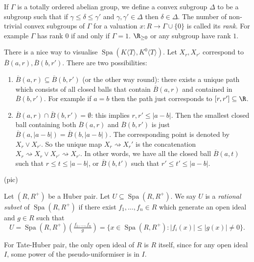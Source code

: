 \documentclass[a4paper]{article}
\DeclareMathOperator{\Spa}{Spa}
\begin{document}
\begin{note}
  If \(\Gamma\) is a totally ordered abelian group, we define a convex subgroup \(\Delta\) to be a subgroup such that if \(\gamma \leq \delta \leq \gamma'\) and \(\gamma, \gamma' \in \Delta\) then \(\delta \in \Delta\). The number of non-trivial convex subgroups of \(\Gamma\) for a valuation \(x: R \to \Gamma \cup \{0\}\) is called its \emph{rank}. For example \(\Gamma\) has rank \(0\) if and only if \(\Gamma = 1\). \(\R_{\geq 0}\) or any subgroup have rank \(1\). 
\end{note}

There is a nice way to visualise \(\Spa(K\langle T\rangle, K^0\langle T\rangle)\). Let \(X_r, X_{r'}\) correspond to \(\overline B(a, r), \overline B(b, r')\). There are two possibilities:
\begin{enumerate}
\item \(\overline B(a, r) \subseteq \overline B(b, r')\) (or the other way round): there exists a unique path which consists of all closed balls that contain \(\overline B(a, r)\) and contained in \(\overline B(b, r')\). For example if \(a = b\) then the path just corresponds to \([r, r'] \subseteq \R\).
\item \(\overline B(a, r) \cap \overline B(b, r') = \emptyset\): this implies \(r, r' \leq |a - b|\). Then the smallest closed ball containing both \(\overline B(a, r)\) and \(\overline B(b, r')\) is just \(\overline B(a, |a - b|) = \overline B(b, |a - b|)\). The corresponding point is denoted by \(X_r \vee X_{r'}\). So the unique map \(X_r \rightsquigarrow X_r'\) is the concatenation \(X_r \rightsquigarrow X_r \vee X_{r'} \rightsquigarrow X_{r'}\). In other words, we have all the closed ball \(\overline B(a, t)\) such that \(r \leq t \leq |a - b|\), or \(\overline B(b, t')\) such that \(r' \leq t' \leq |a - b|\).
\end{enumerate}

(pic)

\begin{definition}
  Let \((R, R^+)\) be a Huber pair. Let \(U \subseteq \Spa(R, R^+)\). We say \(U\) is a \emph{rational subset} of \(\Spa(R, R^+)\) if there exist \(f_1, \dots, f_n \in R\) which generate an open ideal and \(g \in R\) such that
  \[
    U = \Spa(R, R^+) (\tfrac{f_1, \dots, f_n}{g}) = \{x \in \Spa(R, R^+): |f_i(x)| \leq |g(x)| \ne 0\}.
  \]
\end{definition}

\begin{remark}
  For Tate-Huber pair, the only open ideal of \(R\) is \(R\) itself, since for any open ideal \(I\), some power of the pseudo-uniformiser is in \(I\).
\end{remark}
\end{document}
